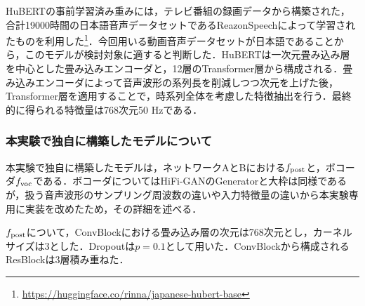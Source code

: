 HuBERTの事前学習済み重みには，テレビ番組の録画データから構築された，合計19000時間の日本語音声データセットであるReazonSpeech\cite{yin2023reazonspeech}によって学習されたもの\cite{sawada2024release}を利用した\footnote{\url{https://huggingface.co/rinna/japanese-hubert-base}}．今回用いる動画音声データセットが日本語であることから，このモデルが検討対象に適すると判断した．HuBERTは一次元畳み込み層を中心とした畳み込みエンコーダと，12層のTransformer層から構成される．畳み込みエンコーダによって音声波形の系列長を削減しつつ次元を上げた後，Transformer層を適用することで，時系列全体を考慮した特徴抽出を行う．最終的に得られる特徴量は768次元50 Hzである．

\subsubsection{本実験で独自に構築したモデルについて}
本実験で独自に構築したモデルは，ネットワークAとBにおける$f_{\text{post}}$と，ボコーダ$f_{\text{voc}}$である．ボコーダについてはHiFi-GANのGeneratorと大枠は同様であるが，扱う音声波形のサンプリング周波数の違いや入力特徴量の違いから本実験専用に実装を改めたため，その詳細を述べる．

$f_{\text{post}}$について，ConvBlockにおける畳み込み層の次元は768次元とし，カーネルサイズは3とした．Dropoutは$p = 0.1$として用いた．ConvBlockから構成されるResBlockは3層積み重ねた．

